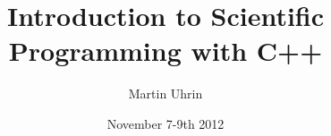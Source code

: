 \newenvironment{dontblocke}[0]{%
  \begin{varblock}{\textbf{Don't}}%
  {bg=dontblockbg,fg=dontblocktext}{bg=dontblocktext,fg=white}
  \lstset{backgroundcolor=}%
  }%
  {\end{varblock}} %

\newcommand{\dontblock}[1]{%
 \begin{varblock}{\textbf{Don't}}{bg=dontblockbg,fg=dontblocktext}{bg=dontblockbg,fg=dontblocktext}
 #1
 \end{varblock} 
}

\newenvironment{defiblocke}[1]{%
  \begin{varblock}{\textbf{Definition}}%
  {bg=defiblockbg,fg=defiblocktext}{bg=defiblocktext,fg=white}
  \lstset{backgroundcolor=}%
  \textit{#1} }
  {\end{varblock}} %

\newcommand{\defiblock}[2]{%
 \begin{varblock}{\textbf{Definition}}%
 {bg=defiblockbg,fg=defiblocktext}{bg=defiblocktext,fg=white}%
  \begin{tabularx}{\linewidth}{lX}\textit{#1} & #2\end{tabularx}
 \end{varblock} 
}

\newcommand{\warnblock}[1]{%
 \begin{varblock}{\textbf{Warning!}}{bg=warnblockbg,fg=warnblocktext}{bg=warnblocktext,fg=white}
  #1
 \end{varblock} 
}

\newcommand{\cout}[1]{%
 Output: \pbox[t]{\textwidth}{\ttfamily\fontsize{9}{10}\selectfont{}#1}
}

\newenvironment{doitemize}[0]{%
  \begin{itemize}}%
  {\end{itemize}} %




\title{Introduction to Scientific Programming with C++}
\author{Martin Uhrin}
\date{November 7-9th 2012}